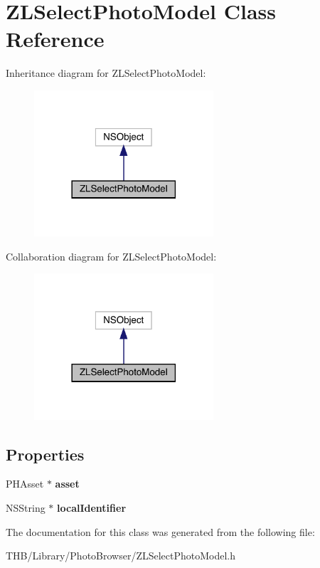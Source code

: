 \hypertarget{interface_z_l_select_photo_model}{}\section{Z\+L\+Select\+Photo\+Model Class Reference}
\label{interface_z_l_select_photo_model}


Inheritance diagram for Z\+L\+Select\+Photo\+Model\+:\nopagebreak
\begin{figure}[H]
\begin{center}
\leavevmode
\includegraphics[width=189pt]{interface_z_l_select_photo_model__inherit__graph}
\end{center}
\end{figure}


Collaboration diagram for Z\+L\+Select\+Photo\+Model\+:\nopagebreak
\begin{figure}[H]
\begin{center}
\leavevmode
\includegraphics[width=189pt]{interface_z_l_select_photo_model__coll__graph}
\end{center}
\end{figure}
\subsection*{Properties}
\begin{DoxyCompactItemize}
\item 
\mbox{\label{interface_z_l_select_photo_model_a840d40e2dd2ee5aa338600339f19e5e1}} 
P\+H\+Asset $\ast$ {\bfseries asset}
\item 
\mbox{\label{interface_z_l_select_photo_model_ab3c682d2f099e00fc6ae08deb1b69560}} 
N\+S\+String $\ast$ {\bfseries local\+Identifier}
\end{DoxyCompactItemize}


The documentation for this class was generated from the following file\+:\begin{DoxyCompactItemize}
\item 
T\+H\+B/\+Library/\+Photo\+Browser/Z\+L\+Select\+Photo\+Model.\+h\end{DoxyCompactItemize}
